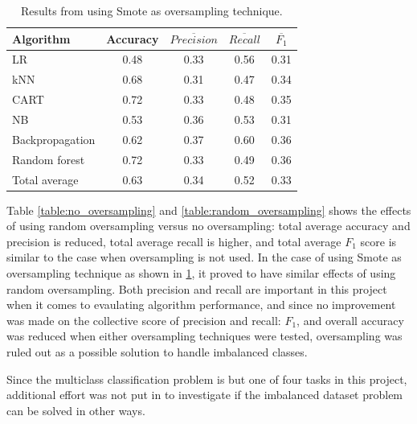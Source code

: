 	\begin{table}[H]
	\centering
	\caption{Results from using Smote as oversampling technique.}
		\begin{tabular}[5]{l | c | c | c | c}
    			Algorithm & Accuracy & $\overline{Precision}$ & $\overline{Recall}$ & $\overline{F_1}$ \\
    			\hline
			LR & 0.48 & 0.33 & 0.56 & 0.31 \\
			kNN & 0.68 &  0.31 & 0.47 &  0.34 \\
			CART & 0.72 & 0.33 & 0.48 &  0.35 \\
			NB &  0.53 & 0.36 & 0.53 & 0.31 \\
			Backpropagation & 0.62 & 0.37 & 0.60 & 0.36 \\
			Random forest & 0.72 & 0.33 & 0.49 &  0.36 \\
			\hline
			Total average & 0.63 & 0.34 & 0.52 & 0.33 
			\label{table:smote_oversampling}
		\end{tabular}
	\end{table}
	
	Table \ref{table:no_oversampling} and \ref{table:random_oversampling} shows the effects of using random oversampling versus no oversampling: total average accuracy and precision is reduced, total average recall is higher, and total average $F_1$ score is similar to the case when oversampling is not used. In the case of using Smote as oversampling technique as shown in \ref{table:smote_oversampling}, it proved to have similar effects of using random oversampling. Both precision and recall are important in this project when it comes to evaulating algorithm performance, and since no improvement was made on the collective score of precision and recall: $F_1$, and overall accuracy was reduced when either oversampling techniques were tested, oversampling was ruled out as a possible solution to handle imbalanced classes. 

	Since the multiclass classification problem is but one of four tasks in this project, additional effort was not put in to investigate if the imbalanced dataset problem can be solved in other ways.
